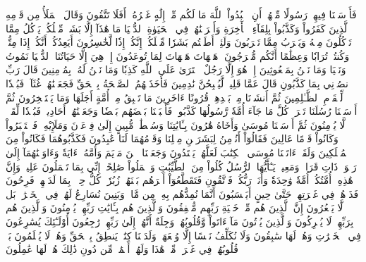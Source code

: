 فَأَرۡسَلۡنَا فِيهِمۡ رَسُولٗا مِّنۡهُمۡ أَنِ ٱعۡبُدُواْ ٱللَّهَ مَا لَكُم مِّنۡ إِلَٰهٍ غَيۡرُهُۥٓۚ أَفَلَا تَتَّقُونَ
وَقَالَ ٱلۡمَلَأُ مِن قَوۡمِهِ ٱلَّذِينَ كَفَرُواْ وَكَذَّبُواْ بِلِقَآءِ ٱلۡأٓخِرَةِ وَأَتۡرَفۡنَٰهُمۡ فِي ٱلۡحَيَوٰةِ ٱلدُّنۡيَا مَا هَٰذَآ إِلَّا بَشَرٞ مِّثۡلُكُمۡ يَأۡكُلُ مِمَّا تَأۡكُلُونَ مِنۡهُ وَيَشۡرَبُ مِمَّا تَشۡرَبُونَ
وَلَئِنۡ أَطَعۡتُم بَشَرٗا مِّثۡلَكُمۡ إِنَّكُمۡ إِذٗا لَّخَٰسِرُونَ
أَيَعِدُكُمۡ أَنَّكُمۡ إِذَا مِتُّمۡ وَكُنتُمۡ تُرَابٗا وَعِظَٰمًا أَنَّكُم مُّخۡرَجُونَ
۞هَيۡهَاتَ هَيۡهَاتَ لِمَا تُوعَدُونَ
إِنۡ هِيَ إِلَّا حَيَاتُنَا ٱلدُّنۡيَا نَمُوتُ وَنَحۡيَا وَمَا نَحۡنُ بِمَبۡعُوثِينَ
إِنۡ هُوَ إِلَّا رَجُلٌ ٱفۡتَرَىٰ عَلَى ٱللَّهِ كَذِبٗا وَمَا نَحۡنُ لَهُۥ بِمُؤۡمِنِينَ
قَالَ رَبِّ ٱنصُرۡنِي بِمَا كَذَّبُونِ
قَالَ عَمَّا قَلِيلٖ لَّيُصۡبِحُنَّ نَٰدِمِينَ
فَأَخَذَتۡهُمُ ٱلصَّيۡحَةُ بِٱلۡحَقِّ فَجَعَلۡنَٰهُمۡ غُثَآءٗۚ فَبُعۡدٗا لِّلۡقَوۡمِ ٱلظَّـٰلِمِينَ
ثُمَّ أَنشَأۡنَا مِنۢ بَعۡدِهِمۡ قُرُونًا ءَاخَرِينَ
مَا تَسۡبِقُ مِنۡ أُمَّةٍ أَجَلَهَا وَمَا يَسۡتَـٔۡخِرُونَ
ثُمَّ أَرۡسَلۡنَا رُسُلَنَا تَتۡرَاۖ كُلَّ مَا جَآءَ أُمَّةٗ رَّسُولُهَا كَذَّبُوهُۖ فَأَتۡبَعۡنَا بَعۡضَهُم بَعۡضٗا وَجَعَلۡنَٰهُمۡ أَحَادِيثَۚ فَبُعۡدٗا لِّقَوۡمٖ لَّا يُؤۡمِنُونَ
ثُمَّ أَرۡسَلۡنَا مُوسَىٰ وَأَخَاهُ هَٰرُونَ بِـَٔايَٰتِنَا وَسُلۡطَٰنٖ مُّبِينٍ
إِلَىٰ فِرۡعَوۡنَ وَمَلَإِيْهِۦ فَٱسۡتَكۡبَرُواْ وَكَانُواْ قَوۡمًا عَالِينَ
فَقَالُوٓاْ أَنُؤۡمِنُ لِبَشَرَيۡنِ مِثۡلِنَا وَقَوۡمُهُمَا لَنَا عَٰبِدُونَ
فَكَذَّبُوهُمَا فَكَانُواْ مِنَ ٱلۡمُهۡلَكِينَ
وَلَقَدۡ ءَاتَيۡنَا مُوسَى ٱلۡكِتَٰبَ لَعَلَّهُمۡ يَهۡتَدُونَ
وَجَعَلۡنَا ٱبۡنَ مَرۡيَمَ وَأُمَّهُۥٓ ءَايَةٗ وَءَاوَيۡنَٰهُمَآ إِلَىٰ رَبۡوَةٖ ذَاتِ قَرَارٖ وَمَعِينٖ
يَـٰٓأَيُّهَا ٱلرُّسُلُ كُلُواْ مِنَ ٱلطَّيِّبَٰتِ وَٱعۡمَلُواْ صَٰلِحًاۖ إِنِّي بِمَا تَعۡمَلُونَ عَلِيمٞ
وَإِنَّ هَٰذِهِۦٓ أُمَّتُكُمۡ أُمَّةٗ وَٰحِدَةٗ وَأَنَا۠ رَبُّكُمۡ فَٱتَّقُونِ
فَتَقَطَّعُوٓاْ أَمۡرَهُم بَيۡنَهُمۡ زُبُرٗاۖ كُلُّ حِزۡبِۭ بِمَا لَدَيۡهِمۡ فَرِحُونَ
فَذَرۡهُمۡ فِي غَمۡرَتِهِمۡ حَتَّىٰ حِينٍ
أَيَحۡسَبُونَ أَنَّمَا نُمِدُّهُم بِهِۦ مِن مَّالٖ وَبَنِينَ
نُسَارِعُ لَهُمۡ فِي ٱلۡخَيۡرَٰتِۚ بَل لَّا يَشۡعُرُونَ
إِنَّ ٱلَّذِينَ هُم مِّنۡ خَشۡيَةِ رَبِّهِم مُّشۡفِقُونَ
وَٱلَّذِينَ هُم بِـَٔايَٰتِ رَبِّهِمۡ يُؤۡمِنُونَ
وَٱلَّذِينَ هُم بِرَبِّهِمۡ لَا يُشۡرِكُونَ
وَٱلَّذِينَ يُؤۡتُونَ مَآ ءَاتَواْ وَّقُلُوبُهُمۡ وَجِلَةٌ أَنَّهُمۡ إِلَىٰ رَبِّهِمۡ رَٰجِعُونَ
أُوْلَـٰٓئِكَ يُسَٰرِعُونَ فِي ٱلۡخَيۡرَٰتِ وَهُمۡ لَهَا سَٰبِقُونَ
وَلَا نُكَلِّفُ نَفۡسًا إِلَّا وُسۡعَهَاۚ وَلَدَيۡنَا كِتَٰبٞ يَنطِقُ بِٱلۡحَقِّ وَهُمۡ لَا يُظۡلَمُونَ
بَلۡ قُلُوبُهُمۡ فِي غَمۡرَةٖ مِّنۡ هَٰذَا وَلَهُمۡ أَعۡمَٰلٞ مِّن دُونِ ذَٰلِكَ هُمۡ لَهَا عَٰمِلُونَ

